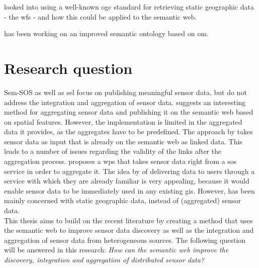 \cite{SW:Jones} looked into using a well-known \ac{ogc} standard for retrieving static geographic data - the \ac{wfs} - and how this could be applied to the semantic web.

\cite{SSW:Cox3} has been working on an improved semantic ontology based on \ac{om}. 

\section{Research question}
Sem-SOS \citep{SSW:Henson, SSW:Pschorr} as well as \ac{sel} \citep{SSW:Janowicz} focus on publishing meaningful sensor data, but do not address the integration and aggregation of sensor data. \cite{SSW:Stasch} suggests an interesting method for aggregating sensor data and publishing it on the semantic web based on spatial features. However, the implementation is limited in the aggregated data it provides, as the aggregates have to be predefined. The approach by \cite{SSW:Stasch} takes sensor data as input that is already on the semantic web as linked data. This leads to a number of issues regarding the validity of the links after the aggregation process. \cite{SSW:Stasch3} proposes a \ac{wps} that takes sensor data right from a \ac{sos} service in order to aggregate it. The idea by \cite{SW:Jones} of delivering data to users through a service with which they are already familiar is very appealing, because it would enable sensor data to be immediately used in any existing \ac{gis}. However, \cite{SW:Jones} has been mainly concerned with static geographic data, instead of (aggregated) sensor data. \\

This thesis aims to build on the recent literature by creating a method that uses the semantic web to improve sensor data discovery as well as the integration and aggregation of sensor data from heterogeneous sources. The following question will be answered in this research:   
\textit{How can the semantic web improve the discovery, integration and aggregation of distributed sensor data?} 












































